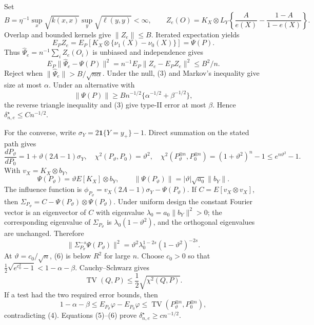 Set
\[
B=\eta^{-1}\sup_x\sqrt{k(x,x)}\sup_y\sqrt{\ell(y,y)}<\infty,\qquad
Z_e(O)=K_X\otimes L_Y\left\{\frac A{e(X)}-\frac{1-A}{1-e(X)}\right\}.
\]
Overlap and bounded kernels give \(\|Z_e\|\le B\). Iterated expectation yields
\[
E_PZ_e=E_P[K_X\otimes\{\nu_1(X)-\nu_0(X)\}]=\Psi(P). \tag{2}
\]
Thus \(\widehat\Psi_e=n^{-1}\sum_iZ_e(O_i)\) is unbiased and independence gives
\[
E_P\|\widehat\Psi_e-\Psi(P)\|^2
=n^{-1}E_P\|Z_e-E_PZ_e\|^2\le B^2/n. \tag{3}
\]
Reject when \(\|\widehat\Psi_e\|>B/\sqrt{n\alpha}\). Under the null, (3) and Markov's inequality give size at most \(\alpha\). Under an alternative with
\[
\|\Psi(P)\|\ge Bn^{-1/2}\{\alpha^{-1/2}+\beta^{-1/2}\},
\]
the reverse triangle inequality and (3) give type-II error at most \(\beta\). Hence \(\delta_{n,e}^\star\le Cn^{-1/2}\).

For the converse, write \(\sigma_Y=2\mathbf1\{Y=y_+\}-1\). Direct summation on the stated path gives
\[
\frac{dP_\vartheta}{dP_0}=1+\vartheta(2A-1)\sigma_Y,\quad
\chi^2(P_\vartheta,P_0)=\vartheta^2,\quad
\chi^2(P_\vartheta^{\otimes n},P_0^{\otimes n})
=(1+\vartheta^2)^n-1\le e^{n\vartheta^2}-1. \tag{4}
\]
With \(v_X=K_X\otimes b_Y\),
\[
\Psi(P_\vartheta)=\vartheta E[K_X]\otimes b_Y,\qquad
\|\Psi(P_\vartheta)\|=|\vartheta|\sqrt{a_0}\|b_Y\|. \tag{5}
\]
The influence function is \(\phi_{P_\vartheta}=v_X(2A-1)\sigma_Y-\Psi(P_\vartheta)\). If \(C=E[v_X\otimes v_X]\), then \(\Sigma_{P_\vartheta}=C-\Psi(P_\vartheta)\otimes\Psi(P_\vartheta)\). Under uniform design the constant Fourier vector is an eigenvector of \(C\) with eigenvalue \(\lambda_0=a_0\|b_Y\|^2>0\); the corresponding eigenvalue of \(\Sigma_{P_\vartheta}\) is \(\lambda_0(1-\vartheta^2)\), and the orthogonal eigenvalues are unchanged. Therefore
\[
\|\Sigma_{P_\vartheta}^{-s}\Psi(P_\vartheta)\|^2
=\vartheta^2\lambda_0^{1-2s}(1-\vartheta^2)^{-2s}. \tag{6}
\]
At \(\vartheta=c_0/\sqrt n\), (6) is below \(R^2\) for large \(n\). Choose \(c_0>0\) so that \(\frac12\sqrt{e^{c_0^2}-1}<1-\alpha-\beta\). Cauchy--Schwarz gives
\[
\operatorname{TV}(Q,P)\le\frac12\sqrt{\chi^2(Q,P)}.
\]
If a test had the two required error bounds, then
\[
1-\alpha-\beta\le E_{P_\vartheta}\varphi-E_{P_0}\varphi
\le\operatorname{TV}(P_\vartheta^{\otimes n},P_0^{\otimes n}),
\]
contradicting (4). Equations (5)--(6) prove \(\delta_{n,e}^\star\ge cn^{-1/2}\).

